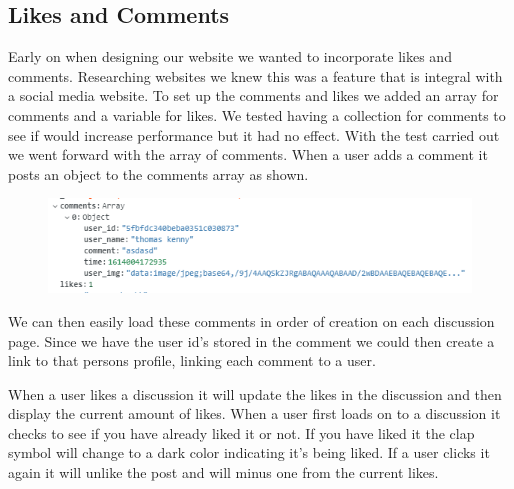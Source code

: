 \subsection{Likes and Comments}
Early on when designing our website we wanted to incorporate likes and comments. Researching websites we knew this was a feature that is integral with a social media website. To set up the comments and likes we added an array for comments and a variable for likes. We tested having a collection for comments to see if would increase performance but it had no effect. With the test carried out we went forward with the array of comments. When a user adds a comment it posts an object to the comments array as shown.
\begin{figure}[H]
  \centering
  \includegraphics[scale=1]{img/Commets_likes.PNG}
  \label{fig:Comments And likes}
\end{figure}
We can then easily load these comments in order of creation on each discussion page. Since we have the user id's stored in the comment we could then create a link to that persons profile, linking each comment to a user. 

When a user likes a discussion it will update the likes in the discussion and then display the current amount of likes. When a user first loads on to a discussion it checks to see if you have already liked it or not. If you have liked it the clap symbol will change to a dark color indicating it's being liked. If a user clicks it again it will unlike the post and will minus one from the current likes.

